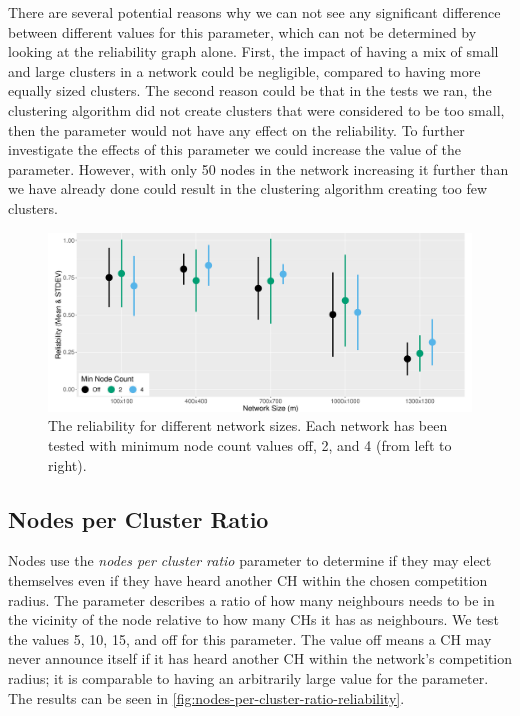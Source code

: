 There are several potential reasons why we can not see any significant difference between different values for this parameter, which can not be determined by looking at the reliability graph alone. First, the impact of having a mix of small and large clusters in a network could be negligible, compared to having more equally sized clusters. The second reason could be that in the tests we ran, the clustering algorithm did not create clusters that were considered to be too small, then the parameter would not have any effect on the reliability. To further investigate the effects of this parameter we could increase the value of the parameter. However, with only 50 nodes in the network increasing it further than we have already done could result in the clustering algorithm creating too few clusters.



\begin{figure}[bt]
    \centering
    \includegraphics[width=\textwidth, keepaspectratio]{figure/Results/ParameterEvaluation/MinNodeCount_Reliability.pdf}
    \caption{The reliability for different network sizes. Each network has been tested with minimum node count values off, 2, and 4 (from left to right).}
    \label{fig:min-node-count-reliability}
\end{figure}

\subsection{Nodes per Cluster Ratio}
Nodes use the \emph{nodes per cluster ratio} parameter to determine if they may elect themselves even if they have heard another CH within the chosen competition radius. The parameter describes a ratio of how many neighbours needs to be in the vicinity of the node relative to how many CHs it has as neighbours. We test the values 5, 10, 15, and off for this parameter. The value off means a CH may never announce itself if it has heard another CH within the network's competition radius; it is comparable to having an arbitrarily large value for the parameter. The results can be seen in \cref{fig:nodes-per-cluster-ratio-reliability}.


